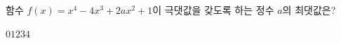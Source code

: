 함수 $f(x)=x^4-4x^3+2ax^2+1$이 극댓값을 갖도록 하는 정수 $a$의 최댓값은?
\begin{choices32}{$0$}{$1$}{$2$}{$3$}{$4$}\end{choices32}
